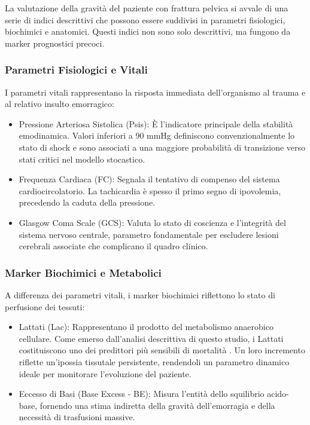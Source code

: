\documentclass[11pt, oneside, noexaminfo]{sapthesis}   	%
\begin{document}
La valutazione della gravità del paziente con frattura pelvica si avvale di una serie di indici descrittivi che possono essere suddivisi in parametri fisiologici, biochimici e anatomici. Questi indici non sono solo descrittivi, ma fungono da marker prognostici precoci.

\subsubsection{Parametri Fisiologici e Vitali}
I parametri vitali rappresentano la risposta immediata dell'organismo al trauma e al relativo insulto emorragico:
\begin{itemize}
	\item {Pressione Arteriosa Sistolica (Psis)}: È l'indicatore principale della stabilità emodinamica. Valori inferiori a 90 mmHg definiscono convenzionalmente lo stato di shock e sono associati a una maggiore probabilità di transizione verso stati critici nel modello stocastico.
	\item {Frequenza Cardiaca (FC)}: Segnala il tentativo di compenso del sistema cardiocircolatorio. La tachicardia è spesso il primo segno di ipovolemia, precedendo la caduta della pressione.
	\item {Glasgow Coma Scale (GCS)}: Valuta lo stato di coscienza e l'integrità del sistema nervoso centrale, parametro fondamentale per escludere lesioni cerebrali associate che complicano il quadro clinico.
\end{itemize}

\subsubsection{Marker Biochimici e Metabolici}
A differenza dei parametri vitali, i marker biochimici riflettono lo stato di perfusione dei tessuti:
\begin{itemize}
\item {Lattati (Lac)}: Rappresentano il prodotto del metabolismo anaerobico cellulare. Come emerso dall'analisi descrittiva di questo studio, i Lattati costituiscono uno dei predittori più sensibili di mortalità \cite{mcnelis2001lactate}. Un loro incremento riflette un'ipossia tissutale persistente, rendendoli un parametro dinamico ideale per monitorare l'evoluzione del paziente.
\item {Eccesso di Basi (Base Excess - BE)}: Misura l'entità dello squilibrio acido-base, fornendo una stima indiretta della gravità dell'emorragia e della necessità di trasfusioni massive.
\end{itemize}
\end{document}
